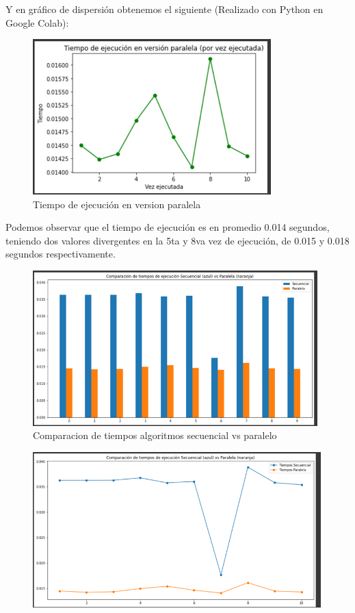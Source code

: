 \documentclass[12pt, letterpaper]{article}
\begin{document}
\begin{flushleft}
    Y en gráfico de dispersión obtenemos el siguiente (Realizado con Python en Google Colab):    
    \begin{figure}[H]
        \includegraphics[width=1\linewidth, height=6cm]{Imagen23} 
        \caption{Tiempo de ejecución en version paralela}
    \end{figure}
    Podemos observar que el tiempo de ejecución es en promedio 0.014 segundos, teniendo dos valores divergentes en la 5ta y 8va vez de ejecución, de 0.015 y 0.018 segundos respectivamente.
    \begin{figure}[H]
        \includegraphics[width=1\linewidth, height=6cm]{Imagen24}
        \caption{Comparacion de tiempos algoritmos secuencial vs paralelo}
    \end{figure}
    \begin{figure}[H]
        \includegraphics[width=1\linewidth, height=6cm]{Imagen25}

\end{figure}
\end{flushleft}
\end{document}
